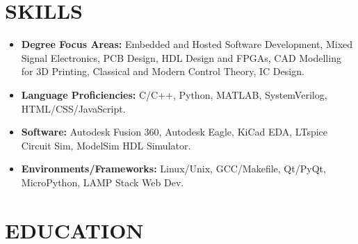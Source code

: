 
\section{SKILLS}
\begin{minipage}{\maincolumnwidth}%
	\small{
    	\begin{itemize}
        \item \textbf{Degree Focus Areas:} Embedded and Hosted Software Development, Mixed Signal Electronics, PCB Design, HDL Design and FPGAs, CAD Modelling for 3D Printing, Classical and Modern Control Theory, IC Design. 
        \item \textbf{Language Proficiencies:} C/C++, Python, MATLAB, SystemVerilog, HTML/CSS/JavaScript.  
        \item \textbf{Software:} Autodesk Fusion 360, Autodesk Eagle, KiCad EDA, LTspice Circuit Sim, ModelSim HDL Simulator.
        \item \textbf{Environments/Frameworks:} Linux/Unix, GCC/Makefile, Qt/PyQt, MicroPython, LAMP Stack Web Dev.
		\end{itemize}}%
\end{minipage}
      




\section{EDUCATION}
{}



